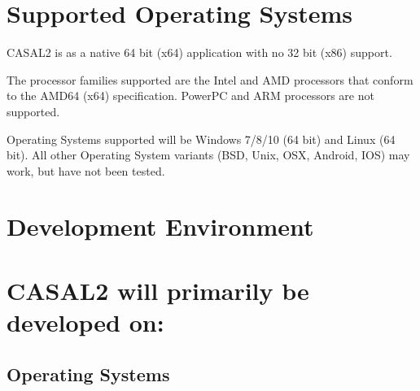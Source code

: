 \documentclass[a4paper,11pt,twoside,pdftex,draft]{article}
\begin{document}
\hypertarget{supported-operating-systems}{%
\section[Supported Operating
Systems]{\texorpdfstring{\protect\hypertarget{anchor-2}{}{}Supported
Operating
Systems}{Supported Operating Systems}}\label{supported-operating-systems}}

CASAL2 is as a native 64 bit (x64) application with no 32 bit (x86)
support.

The processor families supported are the Intel and AMD processors that
conform to the AMD64 (x64) specification. PowerPC and ARM processors are
not supported.

Operating Systems supported will be Windows 7/8/10 (64 bit) and Linux
(64 bit). All other Operating System variants (BSD, Unix, OSX, Android,
IOS) may work, but have not been tested.

\hypertarget{development-environment}{%
\section[Development
Environment]{\texorpdfstring{\protect\hypertarget{anchor-3}{}{}Development
Environment}{Development Environment}}\label{development-environment}}

\hypertarget{casal2-will-primarily-be-developed-on}{%
\section[CASAL2 will primarily be developed
on:]{\texorpdfstring{\protect\hypertarget{anchor-4}{}{}CASAL2 will
primarily be developed
on:}{CASAL2 will primarily be developed on:}}\label{casal2-will-primarily-be-developed-on}}

\hypertarget{operating-systems}{%
\subsection[Operating
Systems]{\texorpdfstring{\protect\hypertarget{anchor-5}{}{}Operating
Systems}{Operating Systems}}\label{operating-systems}}
\end{document}
